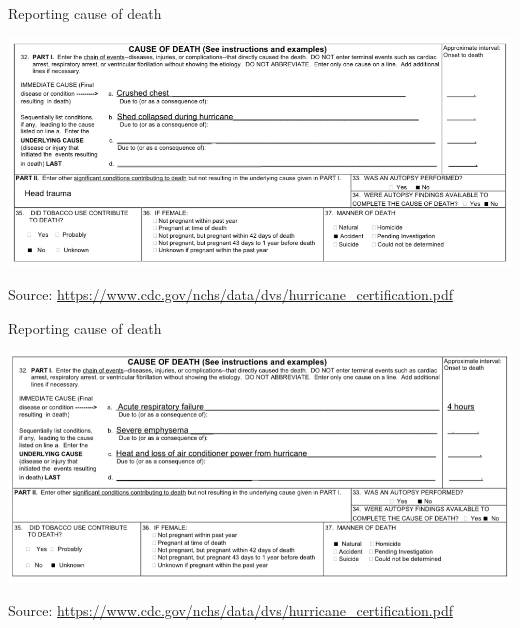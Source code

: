 \documentclass[ignorenonframetext,]{beamer}
\begin{document}
\begin{frame}{Reporting cause of death}

\begin{center}\includegraphics[width=\textwidth]{cdc_direct_death} \end{center}

\vspace{-0.5cm}

\footnotesize

Source:
\url{https://www.cdc.gov/nchs/data/dvs/hurricane_certification.pdf}

\end{frame}

\begin{frame}{Reporting cause of death}

\begin{center}\includegraphics[width=\textwidth]{cdc_indirect_death} \end{center}

\vspace{-0.5cm}

\footnotesize

Source:
\url{https://www.cdc.gov/nchs/data/dvs/hurricane_certification.pdf}

\end{frame}
\end{document}
